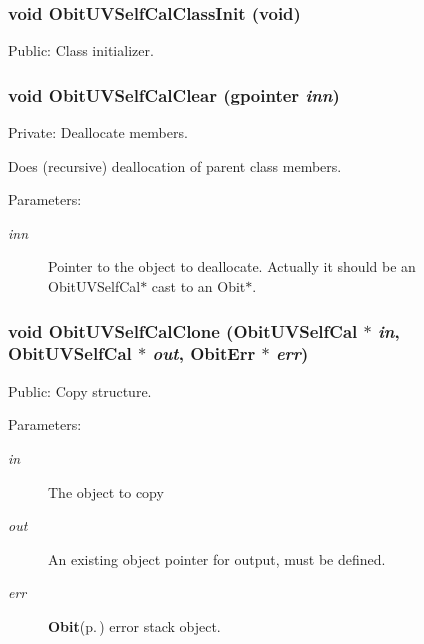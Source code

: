\subsubsection{\setlength{\rightskip}{0pt plus 5cm}void Obit\-UVSelf\-Cal\-Class\-Init (void)}\label{ObitUVSelfCal_8c_a15}


Public: Class initializer. 

\subsubsection{\setlength{\rightskip}{0pt plus 5cm}void Obit\-UVSelf\-Cal\-Clear (gpointer {\em inn})}\label{ObitUVSelfCal_8c_a4}


Private: Deallocate members. 

Does (recursive) deallocation of parent class members. \begin{Desc}
\item[Parameters:]
\begin{description}
\item[{\em inn}]Pointer to the object to deallocate. Actually it should be an Obit\-UVSelf\-Cal$\ast$ cast to an Obit$\ast$. \end{description}
\end{Desc}
\subsubsection{\setlength{\rightskip}{0pt plus 5cm}void Obit\-UVSelf\-Cal\-Clone ({\bf Obit\-UVSelf\-Cal} $\ast$ {\em in}, {\bf Obit\-UVSelf\-Cal} $\ast$ {\em out}, {\bf Obit\-Err} $\ast$ {\em err})}\label{ObitUVSelfCal_8c_a9}


Public: Copy structure. 

\begin{Desc}
\item[Parameters:]
\begin{description}
\item[{\em in}]The object to copy \item[{\em out}]An existing object pointer for output, must be defined. \item[{\em err}]{\bf Obit}{\rm (p.\,\pageref{structObit})} error stack object. \end{description}
\end{Desc}

